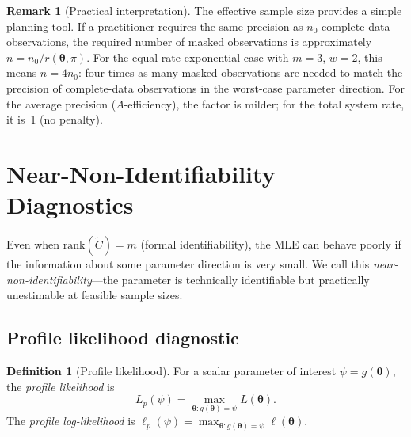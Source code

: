 \documentclass[11pt]{article}
\theoremstyle{definition}
\newtheorem{definition}{Definition}
\newtheorem{remark}{Remark}
\theoremstyle{plain}
\renewcommand{\v}[1]{\boldsymbol{#1}}
\newcommand{\btheta}{\v{\theta}}
\newcommand{\rank}{\mathrm{rank}}
\newcommand{\Ctilde}{\tilde{C}}
\begin{document}
\begin{remark}[Practical interpretation]
\label{rem:ess-practical}
The effective sample size provides a simple planning tool.
If a practitioner requires the same precision as $n_0$ complete-data
observations, the required number of masked observations is approximately
$n = n_0 / r(\btheta, \pi)$.
For the equal-rate exponential case with $m = 3$, $w = 2$, this means
$n = 4 n_0$: four times as many masked observations are needed to
match the precision of complete-data observations in the worst-case
parameter direction.
For the average precision ($A$-efficiency), the factor is milder;
for the total system rate, it is~1 (no penalty).
\end{remark}




\section{Near-Non-Identifiability Diagnostics}
\label{sec:diagnostics}

Even when $\rank(\Ctilde) = m$ (formal identifiability), the MLE
can behave poorly if the information about some parameter direction
is very small.
We call this \emph{near-non-identifiability}---the parameter is
technically identifiable but practically unestimable at feasible
sample sizes.

\subsection{Profile likelihood diagnostic}

\begin{definition}[Profile likelihood]
\label{def:profile-likelihood}
For a scalar parameter of interest $\psi = g(\btheta)$, the
\emph{profile likelihood} is
\begin{equation}
    L_p(\psi) = \max_{\btheta: g(\btheta) = \psi} L(\btheta).
\end{equation}
The \emph{profile log-likelihood} is
$\ell_p(\psi) = \max_{\btheta: g(\btheta) = \psi} \ell(\btheta)$.
\end{definition}
\end{document}
